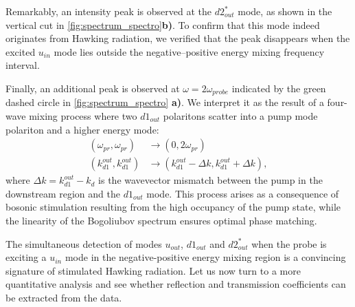 \bigskip

Remarkably, an intensity peak is observed at the $d2_{out}^*$ mode, as shown in the vertical cut in \autoref{fig:spectrum_spectro}\textbf{b)}. To confirm that this mode indeed originates from Hawking radiation, we verified that the peak disappears when the excited $u_{in}$ mode lies outside the negative–positive energy mixing frequency interval.


Finally, an additional peak is observed at $\omega = 2\omega_{probe}$ indicated by the green dashed circle in \autoref{fig:spectrum_spectro} \textbf{a)}. We interpret it as the result of a four-wave mixing process where two $d1_{out}$ polaritons scatter into a pump mode polariton and a higher energy mode:
\begin{equation}
    \begin{aligned}
    (\omega_{pr}, \omega_{pr}) &\to (0, 2\omega_{pr}) \\
    (k_{d1}^{out}, k_{d1}^{out}) &\to (k_{d1}^{out}-\Delta k,k_{d1}^{out}+\Delta k),
    \end{aligned}
    \label{eq:higher_order_four_wave_mixing}
\end{equation}
where $\Delta k=k_{d1}^{out}-k_d$ is the wavevector mismatch between the pump in the downstream region and the $d1_{out}$ mode. This process arises as a consequence of bosonic stimulation resulting from the high occupancy of the pump state, while the linearity of the Bogoliubov spectrum ensures optimal phase matching.

\bigskip

The simultaneous detection of modes $u_{out}$, $d1_{out}$ and $d2_{out}^*$ when the probe is exciting a $u_{in}$ mode in the negative-positive energy mixing region is a convincing signature of stimulated Hawking radiation. Let us now turn to a more quantitative analysis and see whether reflection and transmission coefficients can be extracted from the data.

